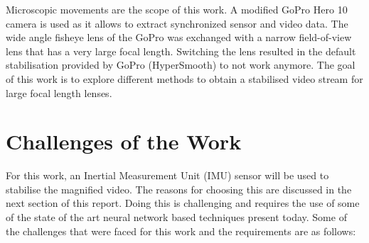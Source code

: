 Microscopic movements are the scope of this work. A modified GoPro Hero 10 camera is used as it allows to extract synchronized sensor and video data. The wide angle fisheye lens of the GoPro was exchanged with a narrow field-of-view lens that has a very large focal length. Switching the lens resulted in the default stabilisation provided by GoPro (HyperSmooth) to not work anymore. The goal of this work is to explore different methods to obtain a stabilised video stream for large focal length lenses.





\section{Challenges of the Work}
For this work, an Inertial Measurement Unit (IMU) sensor will be used to stabilise the magnified video. The reasons for choosing this are discussed in the next section of this report. Doing this is challenging and requires the use of some of the state of the art neural network based techniques present today. Some of the challenges that were faced for this work and the requirements are as follows:

